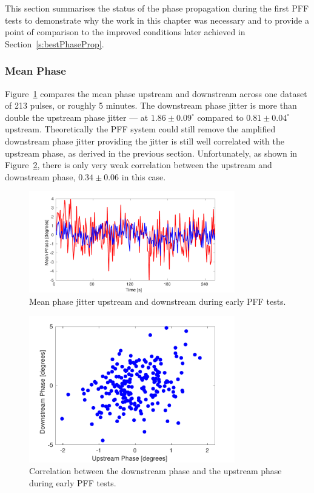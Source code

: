 
This section summarises the status of the phase propagation during the first PFF tests to demonstrate why the work in this chapter was necessary and to provide a point of comparison to the improved conditions later achieved in Section~\ref{s:bestPhaseProp}.

\subsubsection{Mean Phase}

Figure~\ref{f:origMeanPhJit} compares the mean phase upstream and downstream across one dataset of 213 pulses, or roughly 5 minutes. The downstream phase jitter is more than double the upstream phase jitter --- at \(1.86\pm0.09^\circ\) compared to \(0.81\pm0.04^\circ\) upstream. Theoretically the PFF system could still remove the amplified downstream phase jitter providing the jitter is still well correlated with the upstream phase, as derived in the previous section. Unfortunately, as shown in Figure~\ref{f:origUpVsDown}, there is only very weak correlation between the upstream and downstream phase, \(0.34\pm0.06\) in this case.

\begin{figure}
  \centering
  \includegraphics[width=0.8\textwidth]{Figures/propagation/origMeanPhJit}
  \caption{Mean phase jitter upstream and downstream during early PFF tests.}
  \label{f:origMeanPhJit}
\end{figure}

\begin{figure}
  \centering
  \includegraphics[width=0.8\textwidth]{Figures/propagation/origUpVsDown}
  \caption{Correlation between the downstream phase and the upstream phase during early PFF tests.}
  \label{f:origUpVsDown}
\end{figure}

